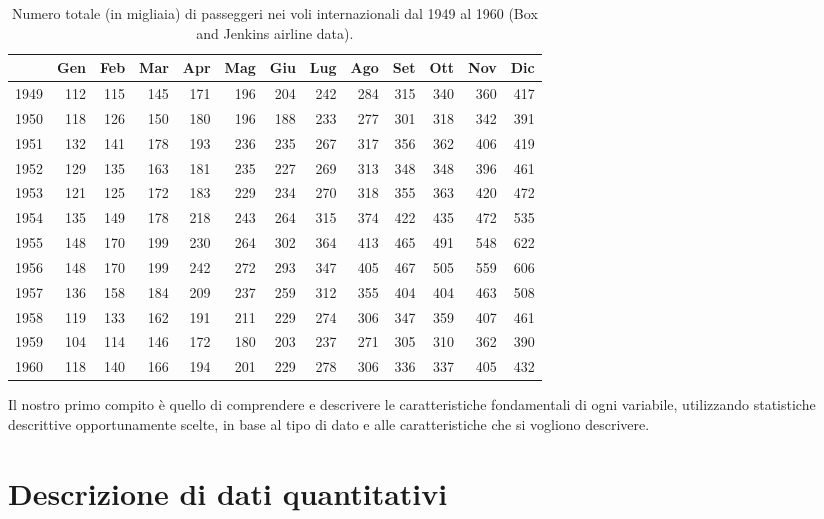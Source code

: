 \documentclass[a4paper,12pt,oneside]{book}
\begin{document}
\begin{table}

\caption{\label{tab:tabName1}Numero totale (in migliaia) di passeggeri nei voli internazionali dal 1949 al 1960 (Box and Jenkins airline data).}
\centering
\begin{tabular}[t]{l|r|r|r|r|r|r|r|r|r|r|r|r}
\hline
  & Gen & Feb & Mar & Apr & Mag & Giu & Lug & Ago & Set & Ott & Nov & Dic\\
\hline
1949 & 112 & 115 & 145 & 171 & 196 & 204 & 242 & 284 & 315 & 340 & 360 & 417\\
\hline
1950 & 118 & 126 & 150 & 180 & 196 & 188 & 233 & 277 & 301 & 318 & 342 & 391\\
\hline
1951 & 132 & 141 & 178 & 193 & 236 & 235 & 267 & 317 & 356 & 362 & 406 & 419\\
\hline
1952 & 129 & 135 & 163 & 181 & 235 & 227 & 269 & 313 & 348 & 348 & 396 & 461\\
\hline
1953 & 121 & 125 & 172 & 183 & 229 & 234 & 270 & 318 & 355 & 363 & 420 & 472\\
\hline
1954 & 135 & 149 & 178 & 218 & 243 & 264 & 315 & 374 & 422 & 435 & 472 & 535\\
\hline
1955 & 148 & 170 & 199 & 230 & 264 & 302 & 364 & 413 & 465 & 491 & 548 & 622\\
\hline
1956 & 148 & 170 & 199 & 242 & 272 & 293 & 347 & 405 & 467 & 505 & 559 & 606\\
\hline
1957 & 136 & 158 & 184 & 209 & 237 & 259 & 312 & 355 & 404 & 404 & 463 & 508\\
\hline
1958 & 119 & 133 & 162 & 191 & 211 & 229 & 274 & 306 & 347 & 359 & 407 & 461\\
\hline
1959 & 104 & 114 & 146 & 172 & 180 & 203 & 237 & 271 & 305 & 310 & 362 & 390\\
\hline
1960 & 118 & 140 & 166 & 194 & 201 & 229 & 278 & 306 & 336 & 337 & 405 & 432\\
\hline
\end{tabular}
\end{table}

Il nostro primo compito è quello di comprendere e descrivere le caratteristiche fondamentali di ogni variabile, utilizzando statistiche descrittive opportunamente scelte, in base al tipo di dato e alle caratteristiche che si vogliono descrivere.

\hypertarget{descrizione-di-dati-quantitativi}{%
\section{Descrizione di dati quantitativi}\label{descrizione-di-dati-quantitativi}}
\end{document}
